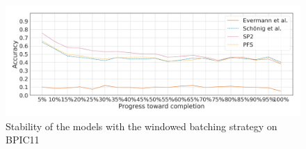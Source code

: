 \begin{figure}[!htb]
    \centering
    \includegraphics[width=\textwidth]{gfx/bpic2011/windowed_stability.png}
    \caption{Stability of the models with the windowed batching strategy on BPIC11}
    \label{fig:bpic11-windowed-stability}
\end{figure}
\FloatBarrier

